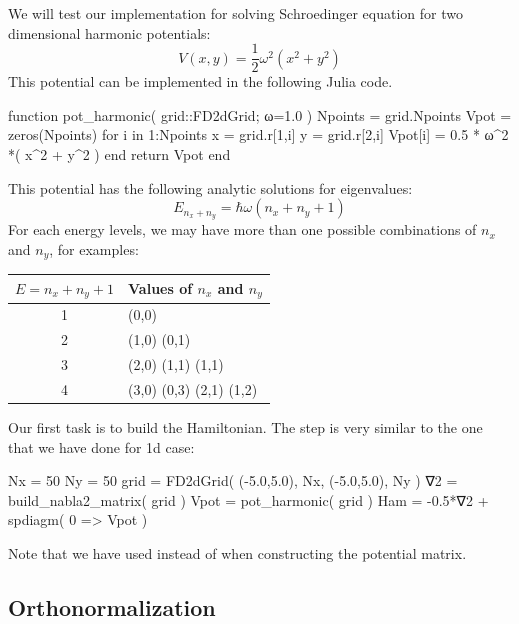 We will test our implementation for solving Schroedinger equation for two
dimensional harmonic potentials:
%
\begin{equation}
V(x,y) = \frac{1}{2} \omega^2 (x^2 + y^2)
\end{equation}
%
This potential can be implemented in the following Julia code.
%
\begin{juliacode}
function pot_harmonic( grid::FD2dGrid; ω=1.0 )
    Npoints = grid.Npoints
    Vpot = zeros(Npoints)
    for i in 1:Npoints
        x = grid.r[1,i]
        y = grid.r[2,i]
        Vpot[i] = 0.5 * ω^2 *( x^2 + y^2 )
    end
    return Vpot
end
\end{juliacode}

This potential has the following analytic solutions for eigenvalues:
\begin{equation}
E_{n_{x} + n_{y}} = \hbar \omega \left( n_{x} + n_{y} + 1 \right)
\end{equation}
For each energy levels, we may have more than one possible combinations
of $n_x$ and $n_y$, for examples:

\begin{table}[h]
\centering
\begin{tabular}{|c|l|}
\hline
$E = n_x + n_y + 1$  &  Values of $n_x$ and $n_y$ \\
\hline
1                  &  (0,0) \\
2                  &  (1,0) (0,1) \\
3                  &  (2,0) (1,1) (1,1) \\
4                  &  (3,0) (0,3) (2,1) (1,2) \\
\hline
\end{tabular}
\end{table}

Our first task is to build the Hamiltonian. The step is very similar
to the one that we have done for 1d case:
\begin{juliacode}
Nx = 50
Ny = 50
grid = FD2dGrid( (-5.0,5.0), Nx, (-5.0,5.0), Ny )
∇2 = build_nabla2_matrix( grid )
Vpot = pot_harmonic( grid )
Ham = -0.5*∇2 + spdiagm( 0 => Vpot )
\end{juliacode}
Note that we have used  instead of
 when constructing the potential matrix.

\subsection{Orthonormalization}

